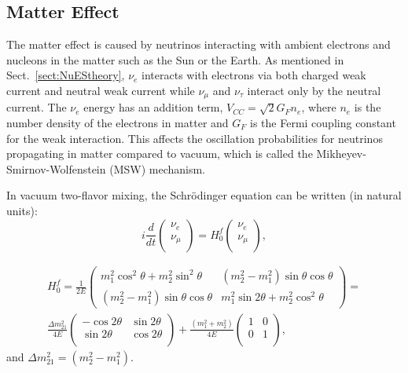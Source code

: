 \subsection{Matter Effect}\label{sect:MSW}
The matter effect is caused by neutrinos interacting with ambient electrons and nucleons in the matter such as the Sun or the Earth. As mentioned in Sect.~\ref{sect:NuEStheory}, $\nu_e$ interacts with electrons via both charged weak current and neutral weak current while $\nu_\mu$ and $\nu_\tau$ interact only by the neutral current. The $\nu_e$ energy has an addition term, $V_{CC} =\sqrt2G_Fn_e$, where $n_e$ is the number density of the electrons in matter and $G_F$ is the Fermi coupling constant for the weak interaction. This affects the oscillation probabilities for neutrinos propagating in matter compared to vacuum, which is called the Mikheyev-Smirnov-Wolfenstein (MSW) mechanism\cite{smirnov2016solar,smirnov2005msw}.

In vacuum two-flavor mixing, the Schr\"{o}dinger equation can be written (in natural units)\cite{xing2011neutrinos}:
\begin{equation}\label{eq:2flavor_simple}
	i\frac{d}{dt}\begin{pmatrix}
		\nu_e\\
		\nu_\mu\\
	\end{pmatrix}
	=
	H^f_0
	\begin{pmatrix}
		\nu_e\\
		\nu_\mu\\
	\end{pmatrix},
\end{equation}

\begin{equation} \label{eq:H0f}
\begin{aligned}
 H^f_0 = \frac{1}{2E}\begin{pmatrix}m^2_1\cos^2\theta+m^2_2\sin^2\theta & (m^2_2-m^2_1)\sin\theta\cos\theta \\ (m^2_2-m^2_1)\sin\theta\cos\theta & m^2_1\sin2\theta+m^2_2\cos^2\theta\end{pmatrix} =
\\
\frac{\Delta m_{21}^2}{4E}\begin{pmatrix}
	-\cos 2\theta & \sin 2\theta\\
	\sin 2\theta & \cos 2\theta\\
\end{pmatrix}+\frac{(m_1^2+m_2^2)}{4E}\begin{pmatrix}
	1 & 0\\
	0 &1\\
\end{pmatrix},
\end{aligned}
\end{equation}
and $\Delta m^2_{21}=(m^2_2 - m^2_1)$.

